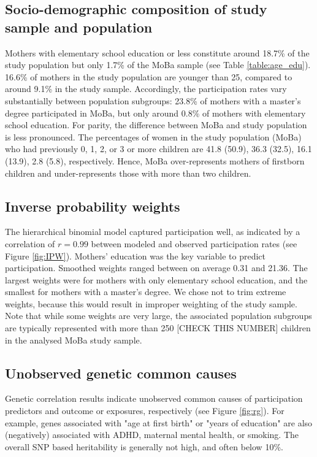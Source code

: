 \documentclass[12pt]{article}
\begin{document}
\subsection*{Socio-demographic composition of study sample and population}
 Mothers with elementary school education or less constitute around 18.7\% of the study population but only 1.7\% of the MoBa sample (see Table \ref{table:age_edu}). 16.6\% of mothers in the study population are younger than 25, compared to around 9.1\% in the study sample. Accordingly, the participation rates vary substantially between population subgroups: 23.8\% of mothers with a master's degree participated in MoBa, but only around 0.8\% of mothers with elementary school education. For parity, the difference between MoBa and study population is less pronounced. The percentages of women in the study population (MoBa) who had previously 0, 1, 2, or 3 or more children are 41.8 (50.9), 36.3 (32.5), 16.1 (13.9), 2.8 (5.8), respectively. Hence, MoBa over-represents mothers of firstborn children and under-represents those with more than two children.

\subsection*{Inverse probability weights}
The hierarchical binomial model captured participation well, as indicated by a correlation of $r=0.99$ between modeled and observed participation rates (see Figure \ref{fig:IPW}). Mothers' education was the key variable to predict participation. Smoothed weights ranged between on average 0.31 and 21.36. The largest weights were for mothers with only elementary school education, and the smallest for mothers with a master's degree. We chose not to trim extreme weights, because this would result in improper weighting of the study sample. Note that while some weights are very large, the associated population subgroups are typically represented with more than 250 [CHECK THIS NUMBER] children in the analysed MoBa study sample.

\subsection*{Unobserved genetic common causes}
Genetic correlation results indicate unobserved common causes of participation predictors and outcome or exposures, respectively (see Figure \ref{fig:rg}). For example, genes associated with "age at first birth" or "years of education" are also (negatively) associated with ADHD, maternal mental health, or smoking. The overall SNP based heritability is generally not high, and often below 10\%.
\end{document}
